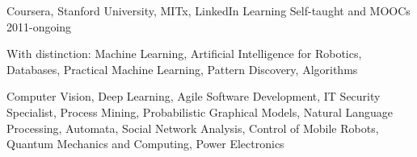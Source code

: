 \begin{cventries}
	\cventry%
		{Coursera, Stanford University, MITx, LinkedIn Learning}
		{Self-taught and MOOCs}
		{}
		{2011-ongoing}
		{\begin{cvitems}
			\item {With distinction: Machine Learning, Artificial Intelligence for Robotics, Databases, Practical Machine Learning, Pattern Discovery, Algorithms}
			\item {Computer Vision, Deep Learning, Agile Software Development, IT Security Specialist, Process Mining, Probabilistic Graphical Models, Natural Language Processing, Automata, Social Network Analysis, Control of Mobile Robots, Quantum Mechanics and Computing, Power Electronics}
		\end{cvitems}}
\end{cventries}
